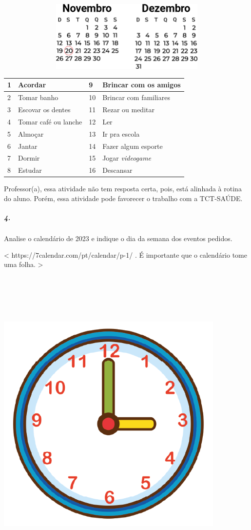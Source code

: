 \includegraphics[width=6.59406in,height=1.38750in]{media/image59.png}

\begin{longtable}[]{@{}llll@{}}
\toprule
1 & Acordar & 9 & Brincar com os amigos\tabularnewline
\midrule
\endhead
2 & Tomar banho & 10 & Brincar com familiares\tabularnewline
3 & Escovar os dentes & 11 & Rezar ou meditar\tabularnewline
4 & Tomar café ou lanche & 12 & Ler\tabularnewline
5 & Almoçar & 13 & Ir pra escola\tabularnewline
6 & Jantar & 14 & Fazer algum esporte\tabularnewline
7 & Dormir & 15 & Jogar \emph{videogame}\tabularnewline
8 & Estudar & 16 & Descansar\tabularnewline
\bottomrule
\end{longtable}

Professor(a), essa atividade não tem resposta certa, pois, está alinhada
à rotina do aluno. Porém, essa atividade pode favorecer o trabalho com a
TCT-SAÚDE.

\subparagraph{4.}\label{section-45}

Analise o calendário de 2023 e indique o dia da semana dos eventos
pedidos.

\textless{} https://7calendar.com/pt/calendar/p-1/ . É importante que o
calendário tome uma folha. \textgreater{}

\includegraphics[width=4.46875in,height=6.30882in]{media/image60.png}

